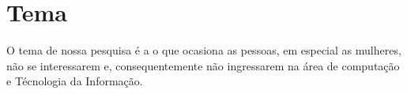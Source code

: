 \documentclass[
	12pt,				%
	oneside,			%
	a4paper,			%
	english,			%
	french,				%
	spanish,			%
	brazil,				%
	]{abntex2}
\author{Caio de Lazari Rosa,\\ Henrique Shodi Maeta e Matheus Rodrigues Souza}
\begin{document}
\frenchspacing 



\imprimirfolhaderosto


\cleardoublepage

\cleardoublepage



\tableofcontents*
\cleardoublepage


\textual

\chapter*[Tema]{Tema}
O tema de nossa pesquisa é a o que ocasiona as pessoas, em especial as mulheres, n\~{a}o se interessarem e, consequentemente n\~{a}o ingressarem na área de computaç\~{a}o e Técnologia da Informaç\~{a}o.
\end{document}
